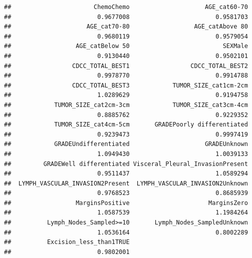 \documentclass[
  11pt,
]{article}
\newenvironment{Shaded}{\begin{snugshade}}{\end{snugshade}}
\newcommand{\CommentTok}[1]{\textcolor[rgb]{0.56,0.35,0.01}{\textit{#1}}}
\begin{document}
\begin{verbatim}
##                       ChemoChemo                     AGE_cat60-70 
##                        0.9677008                        0.9581703 
##                     AGE_cat70-80                  AGE_catAbove 80 
##                        0.9680119                        0.9579054 
##                  AGE_catBelow 50                          SEXMale 
##                        0.9130440                        0.9502101 
##                 CDCC_TOTAL_BEST1                 CDCC_TOTAL_BEST2 
##                        0.9978770                        0.9914788 
##                 CDCC_TOTAL_BEST3            TUMOR_SIZE_cat1cm-2cm 
##                        1.0289629                        0.9194758 
##            TUMOR_SIZE_cat2cm-3cm            TUMOR_SIZE_cat3cm-4cm 
##                        0.8885762                        0.9229352 
##            TUMOR_SIZE_cat4cm-5cm       GRADEPoorly differentiated 
##                        0.9239473                        0.9997419 
##            GRADEUndifferentiated                     GRADEUnknown 
##                        1.0949430                        1.0039133 
##         GRADEWell differentiated Visceral_Pleural_InvasionPresent 
##                        0.9511437                        1.0589294 
##  LYMPH_VASCULAR_INVASION2Present  LYMPH_VASCULAR_INVASION2Unknown 
##                        0.9768523                        0.8685939 
##                  MarginsPositive                      MarginsZero 
##                        1.0587539                        1.1984264 
##          Lymph_Nodes_Sampled>=10       Lymph_Nodes_SampledUnknown 
##                        1.0536164                        0.8002289 
##          Excision_less_than1TRUE 
##                        0.9802001
\end{verbatim}

\begin{Shaded}
\end{Shaded}
\end{document}
